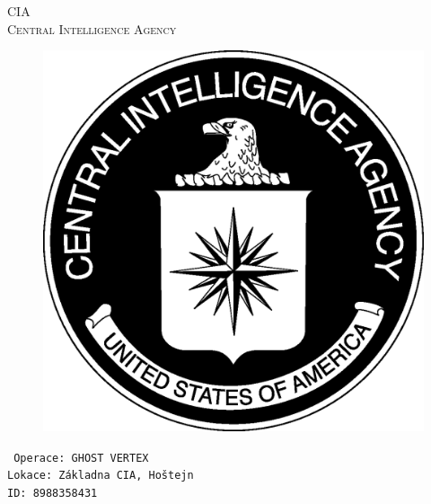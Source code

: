 \documentclass[a4paper, \fontheight]{article}
\begin{document}
	\begin{titlepage}
		\begin{center}		
			\textsc{{\fontsize{80}{0}\selectfont CIA}\\[2em]
				\Huge Central Intelligence Agency\\[2.5em]}
				
			\begin{figure}[H]
				\centering
				\includegraphics[scale=0.6]{sources/CIA_logo.eps}
			\end{figure}
		\end{center}	
		\vfill
		\noindent
		\texttt{\LARGE
				Operace: GHOST VERTEX\\[0.4em]
				Lokace: Základna CIA, Hoštejn\\[0.4em]
				ID: 8988358431}	
\end{titlepage} 
\end{document}

